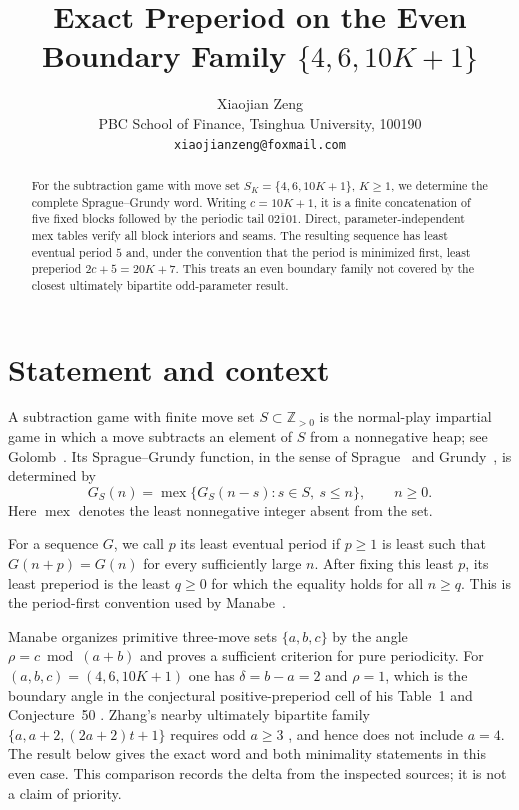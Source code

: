 \documentclass[11pt]{article}
\title{Exact Preperiod on the Even Boundary Family
  $\{4,6,10K+1\}$}
\author{Xiaojian Zeng\\
  PBC School of Finance, Tsinghua University, 100190\\
  \texttt{xiaojianzeng@foxmail.com}}
\date{}
\DeclareMathOperator{\mex}{mex}
\begin{document}
\maketitle

\begin{abstract}
For the subtraction game with move set
$S_K=\{4,6,10K+1\}$, $K\geq 1$, we determine the complete
Sprague--Grundy word.  Writing $c=10K+1$, it is a finite concatenation
of five fixed blocks followed by the periodic tail
$\overline{02101}$.  Direct, parameter-independent mex tables verify all
block interiors and seams.  The resulting sequence has least eventual
period $5$ and, under the convention that the period is minimized first,
least preperiod $2c+5=20K+7$.  This treats an even boundary family not
covered by the closest ultimately bipartite odd-parameter result.
\end{abstract}

\section{Statement and context}

A subtraction game with finite move set $S\subset\mathbb Z_{>0}$ is the
normal-play impartial game in which a move subtracts an element of $S$
from a nonnegative heap; see Golomb~\cite{Golomb1966}.  Its
Sprague--Grundy function, in the sense of
Sprague~\cite{Sprague1935} and Grundy~\cite{Grundy1939}, is determined by
\begin{equation}\label{eq:mex}
 G_S(n)=\mex\{G_S(n-s):s\in S,\ s\leq n\},\qquad n\geq0.
\end{equation}
Here $\mex$ denotes the least nonnegative integer absent from the set.

For a sequence $G$, we call $p$ its least eventual period if $p\geq1$ is
least such that $G(n+p)=G(n)$ for every sufficiently large $n$.  After
fixing this least $p$, its least preperiod is the least $q\geq0$ for which
the equality holds for all $n\geq q$.  This is the period-first
convention used by Manabe~\cite{Manabe2026}.

Manabe organizes primitive three-move sets $\{a,b,c\}$ by the angle
$\rho=c\bmod(a+b)$ and proves a sufficient criterion for pure
periodicity.  For $(a,b,c)=(4,6,10K+1)$ one has
$\delta=b-a=2$ and $\rho=1$, which is the boundary angle in the
conjectural positive-preperiod cell of his Table~1 and Conjecture~50
\cite{Manabe2026}.  Zhang's nearby ultimately bipartite family
$\{a,a+2,(2a+2)t+1\}$ requires odd $a\geq3$
\cite[Theorem~6.3]{Zhang2024}, and hence does not include $a=4$.
The result below gives the exact word and both minimality statements in
this even case.  This comparison records the delta from the inspected
sources; it is not a claim of priority.
\end{document}
